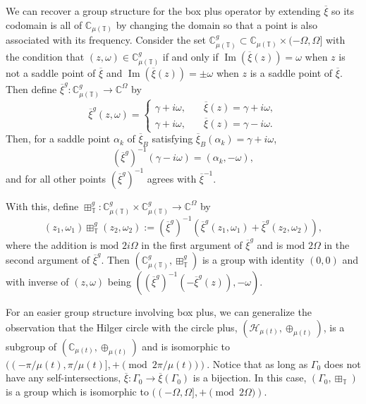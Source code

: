 \documentclass[reqno]{amsart}
\DeclareMathOperator{\myIm}{Im}
\begin{document}
\begin{remark}
\label{rmk:group} \rm
We can recover a group structure for the box plus operator by extending $\overline{\xi}$
so its codomain is all of $\mathbb{C}_{\mu(\mathbb{T})}$ by changing the domain so that a point is
also associated with its frequency. Consider the set
$\mathbb{C}_{\mu(\mathbb{T})}^g \subset \mathbb{C}_{\mu(\mathbb{T})} \times (-\Omega,\Omega]$ with the condition that
$(z,\omega)\in\mathbb{C}_{\mu(\mathbb{T})}^{g}$ if and only if $\myIm(\overline{\xi}(z))=\omega$ when $z$
is not a saddle point of $\overline{\xi}$ and $\myIm(\overline{\xi}(z)) = \pm \omega$ when $z$ is a
saddle point of $\overline{\xi}$. Then define $\overline{\xi}^g:\mathbb{C}_{\mu(\mathbb{T})}^g \to \mathbb{C}^{\Omega}$ by
\[
 \overline{\xi}^g(z,\omega) = \begin{cases}
\gamma + i \omega, \quad & \overline{\xi}(z)=\gamma+i\omega, \\
\gamma + i \omega, \quad & \overline{\xi}(z)=\gamma-i\omega.
 \end{cases}
\]
Then, for a saddle point $\alpha_k$ of $\overline{\xi}_B$ satisfying
$\overline{\xi}_B(\alpha_k)=\gamma+i\omega$,
\[
(\overline{\xi}^g)^{-1}(\gamma-i \omega) = (\alpha_k,-\omega),
\]
and for all other points $(\overline{\xi}^{g})^{-1}$ agrees with $\overline{\xi}^{-1}$.

With this, define
$\boxplus_{\mathbb{T}}^{g}:\mathbb{C}_{\mu(\mathbb{T})}^{g}\times\mathbb{C}_{\mu(\mathbb{T})}^{g}\to\mathbb{C}^{\Omega}$ by
\[%
 (z_1,\omega_1) \boxplus_{\mathbb{T}}^g (z_2,\omega_2)
 := (\overline{\xi}^{g})^{-1}(\overline{\xi}^g(z_1,\omega_1) + \overline{\xi}^g(z_2,\omega_2)),
\]
where the addition is $\text{mod } {2 i \Omega}$ in the first argument of $\overline{\xi}^g$ and is
$\text{mod } 2 \Omega$ in the second argument of $\overline{\xi}^g$.
Then $(\mathbb{C}_{\mu(\mathbb{T})}^g,\boxplus_{\mathbb{T}}^g)$ is a group with identity $(0,0)$ and with
inverse of $(z,\omega)$ being $((\overline{\xi}^g)^{-1}(-\overline{\xi}^g(z)),-\omega)$.
\end{remark}

\begin{remark} \rm
For an easier group structure involving box plus, we can generalize the observation
that the Hilger circle with the circle plus, $({\mathcal H}_{\mu(t)},\oplus_{\mu(t)})$,
is a subgroup of $(\mathbb{C}_{\mu(t)},\oplus_{\mu(t)})$ and is isomorphic to
$((-\pi/\mu(t),\pi/\mu(t)],+ \pmod {2 \pi/\mu(t)})$. Notice that as long as $\Gamma_0$
does not have any self-intersections, $\overline{\xi}:\Gamma_0 \to \overline{\xi}(\Gamma_0)$ is a
bijection. In this case, $(\Gamma_0,\boxplus_{\mathbb{T}})$ is a group which is isomorphic
to $((-\Omega,\Omega],+ \pmod{2 \Omega})$.
\end{remark}
\end{document}
